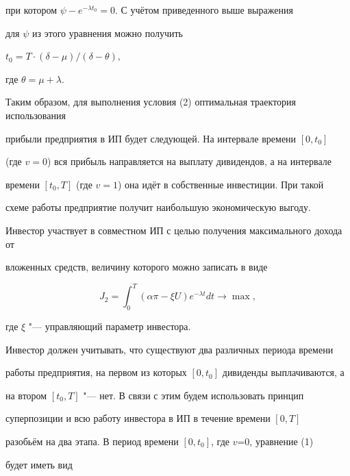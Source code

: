 при котором $\psi-e^{-\lambda t_0}=0$. С учётом приведенного выше выражения 

для $\psi$ из этого уравнения можно получить

$

t_0=T\cdot({\delta-\mu})/({\delta - \theta}),

$

\noindent где $\theta=\mu+\lambda$.



Таким образом, для выполнения условия (2) оптимальная траектория использования 

прибыли предприятия в ИП будет следующей. На интервале времени $[0,t_0]$ 

(где $v=0$) вся прибыль направляется на выплату дивидендов, а на интервале 

времени $[t_0,T]$ (где $v=1$) она идёт в собственные инвестиции. При такой 

схеме работы предприятие получит наибольшую экономическую выгоду.




Инвестор участвует в совместном ИП с целью получения максимального дохода от 

вложенных средств, величину которого можно записать в виде



\begin{equation}

\label{f5}

J_2=\int_{0}^{T}(\alpha\pi-\xi U)e^{-\lambda t}dt\to \max,

\end{equation}



\noindent где $\xi$ "--- управляющий параметр инвестора.



Инвестор должен учитывать, что существуют два различных периода времени 

работы предприятия, на первом из которых $[0,t_0]$ дивиденды выплачиваются, а 

на втором $[t_0,T]$ "--- нет. В связи с этим будем использовать принцип 

суперпозиции и всю работу инвестора в ИП в течение времени $[0,T]$  

разобьём на два этапа. В период времени $[0,t_0]$, где $v$=0, уравнение (1) 

будет иметь вид



